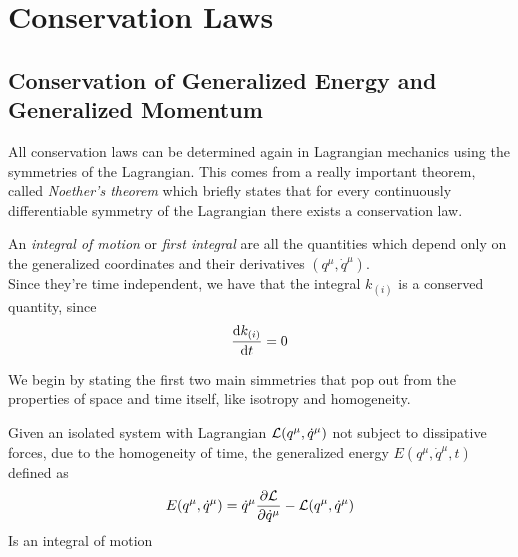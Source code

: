 \documentclass[../admech.tex]{subfiles}
\begin{document}
\section{Conservation Laws}%
\subsection{Conservation of Generalized Energy and Generalized Momentum}
All conservation laws can be determined again in Lagrangian mechanics using the symmetries of the Lagrangian. This comes from a really important theorem, called \emph{Noether's theorem} which briefly states that for every continuously differentiable symmetry of the Lagrangian there exists a conservation law.\\
\begin{dfn}
	An \emph{integral of motion} or \emph{first integral} are all the quantities which depend only on the generalized coordinates and their derivatives $(q^\mu,\dot{q}^\mu)$.\\
	Since they're time independent, we have that the integral $k_{(i)}$ is a conserved quantity, since
	\begin{equation*}
		\dv{k_{(i)}}{t}=0
	\end{equation*}
\end{dfn}
We begin by stating the first two main simmetries that pop out from the properties of space and time itself, like isotropy and homogeneity.
\begin{thm}
	Given an isolated system with Lagrangian $\mathcal{L}(q^\mu,\dot{q}^\mu)$ not subject to dissipative forces, due to the homogeneity of time, the generalized energy $E(q^\mu,\dot{q}^\mu,t)$ defined as
	\begin{equation}
		E(q^\mu,\dot{q}^\mu)=\dot{q}^\mu\pdv{\mathcal{L}}{\dot{q}^\mu}-\mathcal{L}(q^\mu,\dot{q}^\mu)
		\label{eq:genenergy}
	\end{equation}
	Is an integral of motion
\end{thm}
\end{document}
